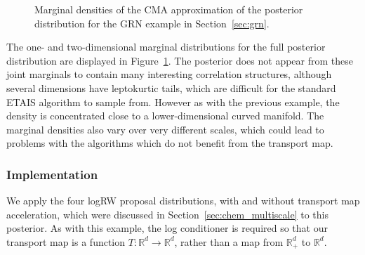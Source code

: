 \documentclass[final]{siamltex}
\newcommand{\edit}[1]{#1}
\begin{document}
\begin{figure}[htb]
\centering
{}%
\caption{Marginal densities of the CMA approximation of the posterior
  distribution for the GRN example in Section~\ref{sec:grn}.}
\label{fig:GRN_posterior}
\end{figure}

The one- and two-dimensional marginal distributions for the full
posterior distribution are displayed in
Figure~\ref{fig:GRN_posterior}. The posterior does not appear from
these joint marginals to contain many
interesting correlation structures, although several dimensions have
leptokurtic tails, which are difficult for the standard ETAIS algorithm
to sample from. However as with the previous example, the density is
concentrated close to a lower-dimensional curved manifold. The marginal densities also vary over very different
scales, which could lead to problems with the algorithms which do not
benefit from the transport map.

\subsubsection{Implementation}

We apply the \edit{four logRW} proposal distributions, with and
without transport map acceleration, which were discussed in
Section~\ref{sec:chem_multiscale} to this posterior. As with this
example, the log conditioner is required so that our transport map is a function $T\colon\mathbb{R}^d\rightarrow\mathbb{R}^d$, rather than a map from $\mathbb{R}_+^d$ to $\mathbb{R}^d$.
\end{document}
